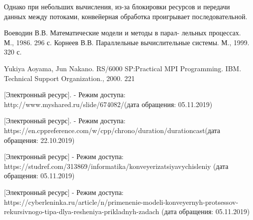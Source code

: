 \documentclass[a4paper,14pt]{article} %
\begin{document}
        Однако при небольших вычисления, из-за блокировки ресурсов и передачи данных между потоками, конвейерная обработка проигрывает последовательной. 
       
 	\newpage

        \begin{thebibliography}{}
        		\bibitem{} Воеводин В.В. Математические модели и методы в парал- лельных процессах. М., 1986. 296 с.
		\bibitem{}  Корнеев В.В. Параллельные вычислительные системы. М., 1999. 320 с.
		
		\bibitem{}  Yukiya Aoyama, Jun Nakano. RS/6000 SP:Practical MPI Programming. IBM. Technical Support Organization., 2000. 221
		
		\bibitem{}  [Электронный ресурс]. - Режим доступа: http://www.myshared.ru/slide/674082/(дата обращения: 05.11.2019)
		
		\bibitem{}  [Электронный ресурс]. - Режим доступа: https://en.cppreference.com/w/cpp/chrono/duration/durationcast(дата обращения: 22.10.2019)
		
		\bibitem{} [Электронный ресурс] - Режим доступа: https://studref.com/313869/informatika/konveyerizatsiyavychisleniy (дата обращения: 05.11.2019)
	
		\bibitem{} [Электронный ресурс] - Режим доступа: https://cyberleninka.ru/article/n/primenenie-modeli-konveyernyh-protsessov-rekursivnogo-tipa-dlya-resheniya-prikladnyh-zadach (дата обращения: 05.11.2019)
	\end{thebibliography} 
\end{document}
